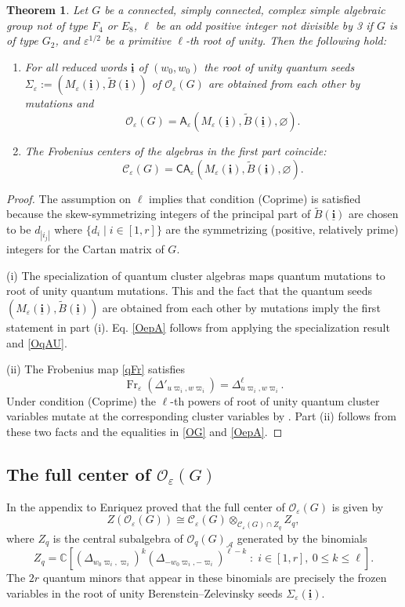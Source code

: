 \documentclass[11pt]{amsart}
\theoremstyle{plain}
\newtheorem{theorem}{Theorem}[section]
\newcommand \bth[1] { \begin{theorem}\label{t#1} }
\renewcommand {\eth} { \end{theorem} }
\def \Cset {{\mathbb C}}
\def \cA {\mathcal{A}}
\def \cC {\mathcal{C}}
\def \A {{\boldsymbol{\mathsf A}}}
\def \C {{\boldsymbol{\mathsf C}}}
\def \B  {{\widetilde{B}}}
\def \OO {{\mathcal{O}}}
\def \vpi {\varpi}
\def \ep {\varepsilon}
\newcommand{\ubi}{\underline{\mathbf{i}}}
\DeclareMathOperator \Fr { {\mathrm{Fr}}}
\begin{document}
\bth{qCl} Let $G$ be a connected, simply connected, complex simple algebraic group not of type $F_4$ or $E_8$, $\ell$ be an odd positive integer
not divisible by 3 if $G$ is of type $G_2$, and $\ep^{1/2}$ be a primitive $\ell$-th root of unity. Then the following hold:
\begin{enumerate}
\item[(i)] For all reduced words $\ubi$ of $(w_0, w_0)$ the root of unity quantum seeds $\Sigma_\ep:=(M_\ep(\ubi), \B(\ubi))$ of $\OO_\ep(G)$ 
are obtained from each other by mutations and 
\begin{equation}
\label{OepA}
\OO_\ep(G) =  \A_\ep(M_\ep(\ubi), \B(\ubi), \varnothing).
\end{equation}
\item[(ii)] The Frobenius centers of the algebras in the first part coincide: 
\[
\cC_\ep(G) =  \C\A_\ep(M_\ep(\ubi), \B(\ubi), \varnothing).
\]
\end{enumerate} 
\eth
\begin{proof} The assumption on $\ell$ implies that condition (Coprime) is satisfied 
because the skew-symmetrizing integers of the principal part of $\B(\ubi)$ are chosen 
to be $d_{|i_j|}$ where $\{d_i \mid i \in [1,r] \}$ are the symmetrizing (positive, relatively prime) 
integers for the Cartan matrix of $G$. 

(i) The specialization of quantum cluster algebras \cite[Eq. (5.2)]{NTY2} maps 
quantum mutations to root of unity quantum mutations.
This and the fact that the quantum seeds $(M_\ep(\ubi), \B(\ubi))$ are obtained from each other by mutations \cite[Theorem A]{QY} 
imply the first statement in part (i). Eq. \eqref{OepA} follows from applying the specialization result \cite[Theorem 5.11]{NTY2} and \eqref{OqAU}. 

(ii) The Frobenius map \eqref{qFr} satisfies 
\[
\Fr_\ep( \Delta'_{u \vpi_i, w \vpi_i} ) = \Delta_{u \vpi_i, w \vpi_i}^\ell.
\]
Under condition (Coprime) the $\ell$-th powers of root of unity quantum cluster variables mutate at the corresponding cluster variables by \cite[Proposition 4.4]{NTY2}.
Part (ii) follows from these two facts and the equalities in \eqref{OG} and \eqref{OepA}. 
\end{proof}

\subsection{The full center of $\OO_\ep(G)$}
In the appendix to \cite{DCL94} Enriquez proved that the full center of $\OO_\ep(G)$ is given by 
\begin{equation}
\label{ZO}
Z(\OO_\ep(G)) \cong \cC_\ep(G) \otimes_{\cC_\ep(G) \cap Z_q} Z_q,
\end{equation}
where $Z_q$ is the central subalgebra of $\OO_q(G)_\cA$ generated by the binomials
\begin{equation}
\label{Zq}
Z_q
=
\Cset \left[
\left(\Delta_{w_0\varpi_i,\varpi_i}\right)^k
\left(\Delta_{-w_0\varpi_i,-\varpi_i}\right)^{\ell-k}
\; : \; 
i\in[1,r],\ 0\leq k\leq \ell
\right].
\end{equation}
The $2r$ quantum minors that appear in these binomials are precisely the frozen variables in the root of unity Berenstein--Zelevinsky seeds $\Sigma_\ep(\ubi)$.  
\end{document}

